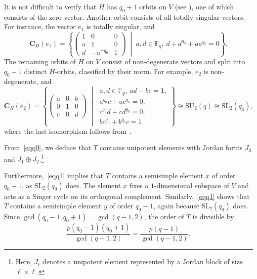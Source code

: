 \documentclass{amsart}
\begin{document}
It is not difficult to verify that $H$ has $q_0 + 1$ orbits on $V$ (see \cite[Lemma~2.10.5~(ii)]{kl}), one of which consists of the zero vector. Another orbit consists of all totally singular vectors. For instance, the vector $e_1$ is totally singular, and
\begin{equation}\label{eqq0}
\mathbf{C}_H(e_1) =
\left\{
\begin{pmatrix}
1 & 0 & 0 \\
a & 1 & 0 \\
d & -a^{-q_0} & 1
\end{pmatrix}
\;\middle|\;
a,d \in \mathbb{F}_q,\ d + d^{q_0} + a a^{q_0} = 0
\right\}.
\end{equation}
The remaining orbits of $H$ on $V$ consist of non-degenerate vectors and split into $q_0 - 1$ distinct $H$-orbits, classified by their norm. For example, $e_2$ is non-degenerate, and
\begin{equation}\label{eqq1}
\mathbf{C}_H(e_2) =
\left\{
\begin{pmatrix}
a & 0 & b \\
0 & 1 & 0 \\
c & 0 & d
\end{pmatrix}
\;\middle|\;
\begin{array}{l}
a,d \in \mathbb{F}_q,\ ad - bc = 1, \\
a^{q_0} c + a c^{q_0} = 0, \\
c^{q_0} d + c d^{q_0} = 0, \\
bc^{q_0} + b^{q_0} c = 1
\end{array}
\right\}\cong\mathrm{SU}_2(q)
\cong \mathrm{SL}_2(q_0),
\end{equation}
where the last isomorphism follows from~\cite[Proposition~2.9.1~(i)]{kl}.

From~\eqref{eqq0}, we deduce that $T$ contains unipotent elements with Jordan forms $J_3$ and $J_1 \oplus J_2$.\footnote{Here, $J_\ell$ denotes a unipotent element represented by a Jordan block of size $\ell \times \ell$.} 

Furthermore,~\eqref{eqq1} implies that $T$ contains a semisimple element $x$ of order $q_0 + 1$, as $\mathrm{SL}_2(q_0)$ does. The element $x$ fixes a $1$-dimensional subspace of $V$ and acts as a Singer cycle on its orthogonal complement. Similarly,~\eqref{eqq1} shows that $T$ contains a semisimple element $y$ of order $q_0 - 1$, again because $\mathrm{SL}_2(q_0)$ does. Since $\gcd(q_0 - 1, q_0 + 1) = \gcd(q - 1, 2)$, the order of $T$ is divisible by
\[
\frac{p(q_0 - 1)(q_0 + 1)}{\gcd(q - 1, 2)} = \frac{p(q - 1)}{\gcd(q - 1, 2)}.
\]
\end{document}

